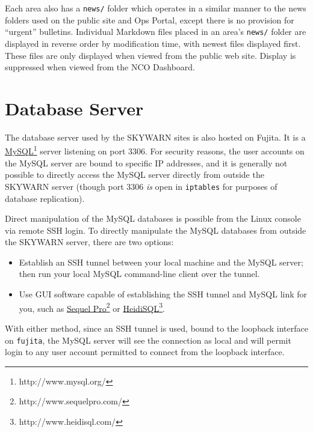 \documentclass[pdflatex,letterpaper,twoside,12pt]{book}
\begin{document}
Each area also has a \texttt{news/} folder which operates in a similar manner to the news folders used on the public site and Ops Portal, except there is no provision for ``urgent'' bulletins.  Individual Markdown files placed in an area's \texttt{news/} folder are displayed in reverse order by modification time, with newest files displayed first.  These files are only displayed when viewed from the public web site.  Display is suppressed when viewed from the NCO Dashboard.


\section{Database Server}\label{database-server}

The database server used by the SKYWARN sites is also hosted on Fujita.  It is a \href{http://www.mysql.org}{MySQL}\footnote{http://www.mysql.org/} server listening on port 3306.  For security reasons, the user accounts on the MySQL server are bound to specific IP addresses, and it is generally not possible to directly access the MySQL server directly from outside the SKYWARN server (though port 3306 \emph{is} open in \texttt{iptables} for purposes of database replication).

Direct manipulation of the MySQL databases is possible from the Linux console via remote SSH login.  To directly manipulate the MySQL databases from outside the SKYWARN server, there are two options:

\begin{itemize}
\item Establish an SSH tunnel between your local machine and the MySQL server;  then run your local MySQL command-line client over the tunnel.

\item Use GUI software capable of establishing the SSH tunnel and MySQL link for you, such as \href{http://www.sequelpro.com/}{Sequel Pro}\footnote{http://www.sequelpro.com/} or \href{http://www.heidisql.com/}{HeidiSQL}\footnote{http://www.heidisql.com/}.
\end{itemize}

With either method, since an SSH tunnel is used, bound to the loopback interface on \texttt{fujita}, the MySQL server will see the connection as local and will permit login to any user account permitted to connect from the loopback interface.
\end{document}

